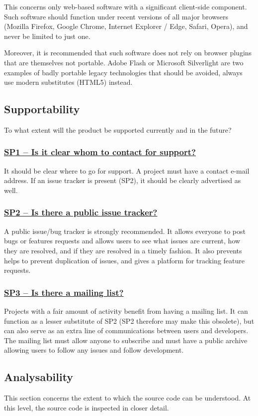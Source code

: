 \documentclass[a4paper,11pt]{article}
\newcommand{\indicator}[1]{\subsubsection*{\underline{#1}}}
\begin{document}
This concerns only web-based software with a significant client-side component.
Such software should function under recent versions of all major browsers
(Mozilla Firefox, Google Chrome, Internet Explorer / Edge, Safari, Opera), and
never be limited to just one.

Moreover, it is recommended that such software does not rely on browser plugins that
are themselves not portable. Adobe Flash or Microsoft Silverlight are two
examples of badly portable legacy technologies that should be avoided, always use
modern substitutes (HTML5) instead.

\subsection{Supportability}

To what extent will the product be supported currently and in the future?

\indicator{SP1 -- Is it clear whom to contact for support?}

It should be clear where to go for support. A project must have a contact
e-mail address. If an issue tracker is present (SP2), it should be clearly advertised
as well.

\indicator{SP2 -- Is there a public issue tracker?}

A public issue/bug tracker is strongly recommended. It allows everyone to post
bugs or features requests and allows users to see what issues are current, how
they are resolved, and if they are resolved in a timely fashion. It also
prevents helps to prevent duplication of issues, and gives a platform for
tracking feature requests.

\indicator{SP3 -- Is there a mailing list?}

Projects with a fair amount of activity benefit from having a mailing list. It
can function as a lesser substitute of SP2 (SP2 therefore may make this
obsolete), but can also serve as an extra line of communications between users
and developers. The mailing list must allow anyone to subscribe and must have a
public archive allowing users to follow any issues and follow development.

\subsection{Analysability}

This section concerns the extent to which the source code can be understood. At
this level, the source code is inspected in closer detail.
\end{document}
